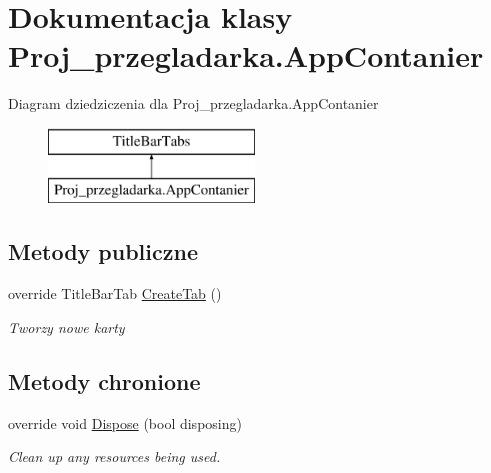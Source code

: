 \hypertarget{class_proj__przegladarka_1_1_app_contanier}{}\section{Dokumentacja klasy Proj\+\_\+przegladarka.\+App\+Contanier}
\label{class_proj__przegladarka_1_1_app_contanier}
Diagram dziedziczenia dla Proj\+\_\+przegladarka.\+App\+Contanier\begin{figure}[H]
\begin{center}
\leavevmode
\includegraphics[height=2.000000cm]{class_proj__przegladarka_1_1_app_contanier}
\end{center}
\end{figure}
\subsection*{Metody publiczne}
\begin{DoxyCompactItemize}
\item 
override Title\+Bar\+Tab \mbox{\hyperlink{class_proj__przegladarka_1_1_app_contanier_ab11a413a1a0d9bf970f8e9c1e124fbce}{Create\+Tab}} ()
\begin{DoxyCompactList}\small\item\em Tworzy nowe karty \end{DoxyCompactList}\end{DoxyCompactItemize}
\subsection*{Metody chronione}
\begin{DoxyCompactItemize}
\item 
override void \mbox{\hyperlink{class_proj__przegladarka_1_1_app_contanier_a2827fbfbdd9cea7ccb6816f2d6e22c9a}{Dispose}} (bool disposing)
\begin{DoxyCompactList}\small\item\em Clean up any resources being used. \end{DoxyCompactList}\end{DoxyCompactItemize}
